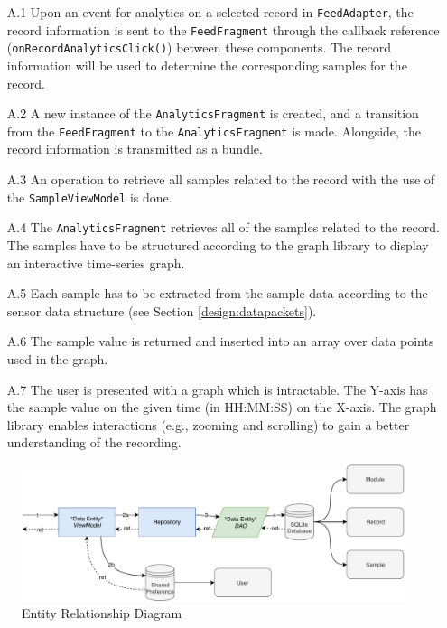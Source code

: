 \begin{itemize}
    \item[A.1] Upon an event for analytics on a selected record in \verb|FeedAdapter|, the record information is sent to the \verb|FeedFragment| through the callback reference (\verb|onRecordAnalyticsClick()|) between these components. The record information will be used to determine the corresponding samples for the record.
    \item[A.2] A new instance of the \verb|AnalyticsFragment| is created, and a transition from the \verb|FeedFragment| to the \verb|AnalyticsFragment| is made. Alongside, the record information is transmitted as a bundle.
    \item[A.3] An operation to retrieve all samples related to the record with the use of the \verb|SampleViewModel| is done. 
    \item[A.4] The \verb|AnalyticsFragment| retrieves all of the samples related to the record. The samples have to be structured according to the graph library to display an interactive time-series graph.
    \item[A.5] Each sample has to be extracted from the sample-data according to the sensor data structure (see Section \ref{design:datapackets}).
    \item[A.6] The sample value is returned and inserted into an array over data points used in the graph. 
    \item[A.7] The user is presented with a graph which is intractable. The Y-axis has the sample value on the given time (in HH:MM:SS) on the X-axis. The graph library enables interactions (e.g., zooming and scrolling) to gain a better understanding of the recording. 
\end{itemize}

\begin{figure}[!h]
    \centering
    \includegraphics[scale=0.60]{images/Storage_Imp.pdf}
    \caption{Entity Relationship Diagram}
    \label{fig:impl_storage}
\end{figure}

